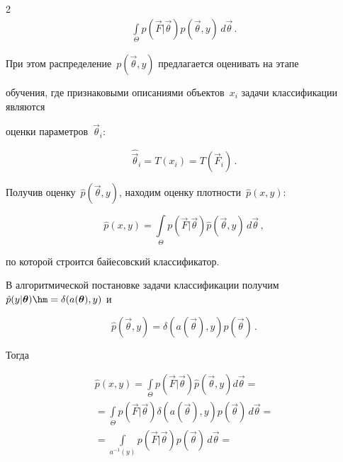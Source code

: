 \begin{multicols}{2}
\begin{multline*}
\int\limits_{\Theta}p(\vec{F}|\vec\theta)p(\vec\theta,y)\,d\vec\theta\,.


\end{multline*}


При этом распределение~$p(\vec\theta,y)$ предлагается оценивать на этапе 


обучения, где признаковыми описаниями объектов~$x_i$ задачи классификации являются 


оценки параметров~$\vec\theta_i$:


$$


\hat{\vec\theta}_i=T(x_i)=T(\vec{F}_i)\,.


$$


Получив оценку~$\hat{p}(\vec\theta,y)$, находим оценку плот\-ности~$\hat{p}(x,y)$:


$$


\hat{p}(x,y)=


\int\limits_{\Theta}p(\vec{F}|\vec\theta)\hat{p}(\vec\theta,y)\,d\vec\theta\,,


$$


по которой строится байесовский классификатор.





\pagebreak





В алгоритмической постановке задачи классификации получим~$\hat{p}(y|\vec\theta)


\hm=\delta(a(\vec\theta),y)$ и


$$


\hat{p}(\vec\theta,y)=\delta(a(\vec\theta),y)p(\vec\theta)\,.


$$


Тогда


\begin{multline*}


\hat{p}(x,y)=


\int\limits_{\Theta}\!p\left(\vec{F}|\vec\theta\right)\hat{p}


(\vec\theta,y)d\vec\theta={}\\


{}=


\int\limits_{\Theta}\!p\left(\vec{F}|\vec\theta\right)\delta\left(a\left(\vec\theta\right),y\right)


p\left(\vec\theta\right)\,d\vec\theta={}\\


{}=\int\limits_{a^{-1}(y)}\!p\left(\vec{F}|\vec\theta\right)p\left(\vec\theta\right)\,d\vec\theta=



\end{multline*}
\end{multicols}
